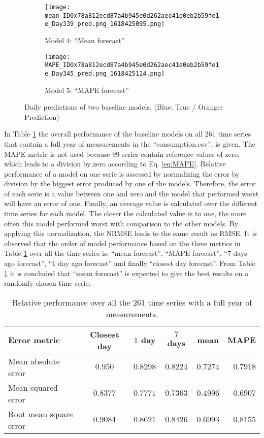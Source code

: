\begin{figure}[ht]
	\begin{subfigure}{0.5\textwidth}
		\texttt{[image: mean\_ID0x78a812ecd87a4b945e0d262aec41e0eb2b59fe1e\_Day339\_pred.png\_1618425095.png]}
		\caption{Model 4: ``Mean forecast''}
	\end{subfigure}	
	\begin{subfigure}{0.5\textwidth}
		\texttt{[image: MAPE\_ID0x78a812ecd87a4b945e0d262aec41e0eb2b59fe1e\_Day345\_pred.png\_1618425124.png]}
		\caption{Model 5: ``MAPE forecast''}
	\end{subfigure}
	\caption{Daily predictions of two baseline models. (Blue: True / Orange: Prediction) }
	\label{fig:baseline models 4 and 5}
\end{figure}


In Table \ref{tab:summ_data_rel_performance} the overall performance of the baseline models on all $ 261 $ time series that contain a full year of measurements in the ``consumption.csv'', is given. The MAPE metric is not used because $ 99 $ series contain reference values of zero, which leads to a division by zero according to Eq. \ref{eq:MAPE}. Relative performance of a model on one serie is assessed by normalizing the error by division by the biggest error produced by one of the models. Therefore, the error of each serie is a value between one and zero and the model that performed worst will have an error of one. Finally, an average value is calculated over the different time series for each model. The closer the calculated value is to one, the more often this model performed worst with comparison to the other models. By applying this normalization, the NRMSE leads to the same result as RMSE. It is observed that the order of model performance based on the three metrics in Table \ref{tab:summ_data_rel_performance} over all the time series is: ``mean forecast'', ``MAPE forecast'', ``7 days ago forecast'', ``1 day ago forecast'' and finally ``closest day forecast''. From Table \ref{tab:summ_data_rel_performance} it is concluded that ``mean forecast'' is expected to give the best results on a randomly chosen time serie.

\begin{table}[ht]
	\centering
	\begin{tabular}{@{}l|ccccr@{}} \toprule
		\textbf{Error metric}	& \textbf{Closest day} & \textbf{$ 1 $ day} & \textbf{$ 7 $ days} & \textbf{mean} & \textbf{MAPE}\\\midrule
		Mean absolute error& \cellcolor{red!25}$0.950 $&$ 0.8298 $  & $0.8224 $ & \cellcolor{green!25}$ 0.7274 $ & $ 0.7918 $\\
		Mean squared error& \cellcolor{red!25}$0.8377 $&$ 0.7771 $  & $0.7363 $ & \cellcolor{green!25}$ 0.4996 $ & $ 0.6907 $\\
		Root mean square error& \cellcolor{red!25}$0.9084 $&$ 0.8621$  & $0.8426$ & \cellcolor{green!25}$ 0.6993$ & $ 0.8155$\\\bottomrule
	\end{tabular}
	\caption{Relative performance over all the $ 261 $ time series with a full year of measurements.}
	\label{tab:summ_data_rel_performance}
\end{table}


